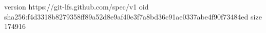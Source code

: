 version https://git-lfs.github.com/spec/v1
oid sha256:f4d3318b8279358ff89a52d8e9af40e3f7a8bd36c91ae0337abe4f90f73484ed
size 174916
